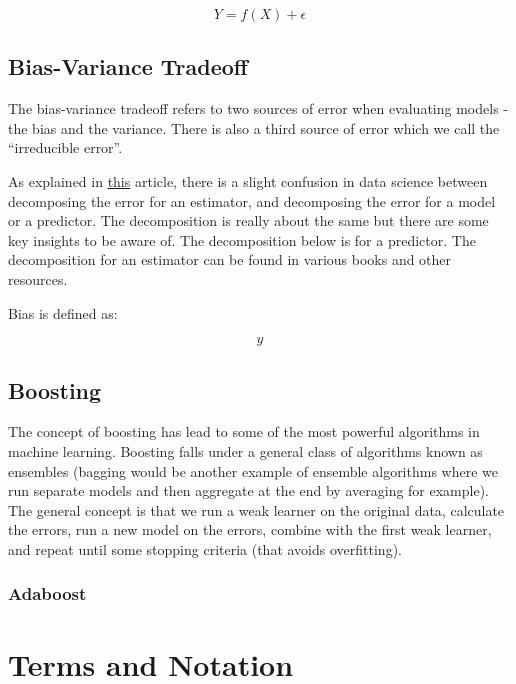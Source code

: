 \documentclass[paper=a4, fontsize=11pt]{scrartcl} %
\numberwithin{equation}{section} %
\numberwithin{figure}{section} %
\numberwithin{table}{section} %
\begin{document}
\begin{equation}
Y = f(X) + \epsilon
\end{equation}

\subsection{Bias-Variance Tradeoff}

The bias-variance tradeoff refers to two sources of error when evaluating models - the bias and the variance. There is also a third source of error which we call the ``irreducible error''. 

As explained in \href{https://towardsdatascience.com/mse-and-bias-variance-decomposition-77449dd2ff55}{this} article, there is a slight confusion in data science between decomposing the error for an \gls{estimator}, and decomposing the error for a model or a predictor. The decomposition is really about the same but there are some key insights to be aware of. The decomposition below is for a predictor. The decomposition for an estimator can be found in various books and other resources. 


Bias is defined as:

\begin{equation}
y
\end{equation}



\subsection{Boosting}

The concept of boosting has lead to some of the most powerful algorithms in machine learning. Boosting falls under a general class of algorithms known as ensembles (bagging would be another example of ensemble algorithms where we run separate models and then aggregate at the end by averaging for example). The general concept is that we run a weak learner on the original data, calculate the errors, run a new model on the errors, combine with the first weak learner, and repeat until some stopping criteria (that avoids overfitting).

\subsubsection{Adaboost}


\section{Terms and Notation}
\end{document}
